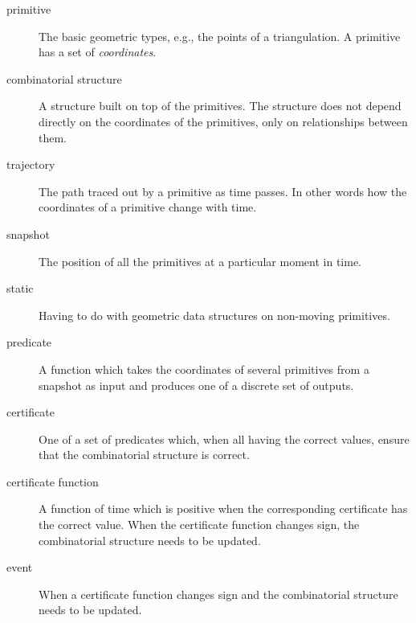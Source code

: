 \begin{description}
\item[primitive] The basic geometric types, e.g., the points of a
  triangulation. A primitive has a set of {\em coordinates}.
\item[combinatorial structure] A structure built on top of the
  primitives. The structure does not depend directly on the
  coordinates of the primitives, only on relationships between them.
\item[trajectory] The path traced out by a primitive as time passes.
  In other words how the coordinates of a primitive change with time.
\item[snapshot] The position of all the primitives at a particular
  moment in time.
\item[static] Having to do with geometric data structures on
  non-moving primitives.
\item[predicate] A function which takes the coordinates of several
  primitives from a snapshot as input and produces one of a discrete
  set of outputs.
\item[certificate] One of a set of predicates which, when all having
  the correct values, ensure that the combinatorial structure is
  correct.
\item[certificate function] A function of time which is positive when
  the corresponding certificate has the correct value. When the
  certificate function changes sign, the combinatorial structure needs
  to be updated.
\item[event] When a certificate function changes sign and the
  combinatorial structure needs to be updated.
\end{description}
